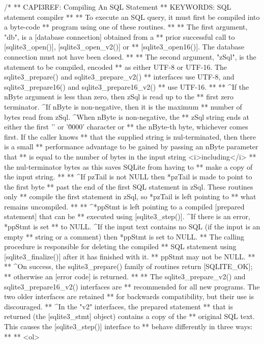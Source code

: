 \begin{Codex}[label=sqlite3.h,numbers=left]
{/*
** CAPI3REF: Compiling An SQL Statement
** KEYWORDS: {SQL statement compiler}
**
** To execute an SQL query, it must first be compiled into a byte-code
** program using one of these routines.
**
** The first argument, "db", is a [database connection] obtained from a
** prior successful call to [sqlite3_open()], [sqlite3_open_v2()] or
** [sqlite3_open16()].  The database connection must not have been closed.
**
** The second argument, "zSql", is the statement to be compiled, encoded
** as either UTF-8 or UTF-16.  The sqlite3_prepare() and sqlite3_prepare_v2()
** interfaces use UTF-8, and sqlite3_prepare16() and sqlite3_prepare16_v2()
** use UTF-16.
**
** ^If the nByte argument is less than zero, then zSql is read up to the
** first zero terminator. ^If nByte is non-negative, then it is the maximum
** number of  bytes read from zSql.  ^When nByte is non-negative, the
** zSql string ends at either the first '' or '\u0000' character or
** the nByte-th byte, whichever comes first. If the caller knows
** that the supplied string is nul-terminated, then there is a small
** performance advantage to be gained by passing an nByte parameter that
** is equal to the number of bytes in the input string <i>including</i>
** the nul-terminator bytes as this saves SQLite from having to
** make a copy of the input string.
**
** ^If pzTail is not NULL then *pzTail is made to point to the first byte
** past the end of the first SQL statement in zSql.  These routines only
** compile the first statement in zSql, so *pzTail is left pointing to
** what remains uncompiled.
**
** ^*ppStmt is left pointing to a compiled [prepared statement] that can be
** executed using [sqlite3_step()].  ^If there is an error, *ppStmt is set
** to NULL.  ^If the input text contains no SQL (if the input is an empty
** string or a comment) then *ppStmt is set to NULL.
** The calling procedure is responsible for deleting the compiled
** SQL statement using [sqlite3_finalize()] after it has finished with it.
** ppStmt may not be NULL.
**
** ^On success, the sqlite3_prepare() family of routines return [SQLITE_OK];
** otherwise an [error code] is returned.
**
** The sqlite3_prepare_v2() and sqlite3_prepare16_v2() interfaces are
** recommended for all new programs. The two older interfaces are retained
** for backwards compatibility, but their use is discouraged.
** ^In the "v2" interfaces, the prepared statement
** that is returned (the [sqlite3_stmt] object) contains a copy of the
** original SQL text. This causes the [sqlite3_step()] interface to
** behave differently in three ways:
**
** <ol>
}
\end{Codex}
